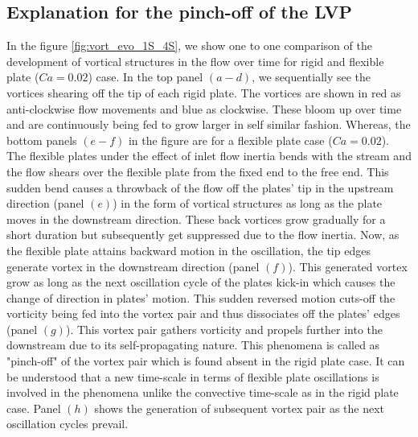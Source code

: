 \documentclass[final,3p,10pt,times,review,authoryear]{elsarticle}
\begin{document}
	\subsection{Explanation for the pinch-off of the LVP}
	 
	In the figure \ref{fig:vort_evo_1S_4S}, we show one to one comparison of the development of vortical structures in the flow over time for rigid and flexible plate ($Ca=0.02$) case. In the top panel $(a-d)$, we sequentially see the vortices shearing off the tip of each rigid plate. The vortices are shown in red as anti-clockwise flow movements and blue as clockwise. These bloom up over time and are continuously being fed to grow larger in self similar fashion. Whereas, the bottom panels $(e-f)$ in the figure are for a flexible plate case ($Ca=0.02$). The flexible plates under the effect of inlet flow inertia bends with the stream and the flow shears over the flexible plate from the fixed end to the free end. This sudden bend causes a throwback of the flow off the plates' tip in the upstream direction (panel $(e)$) in the form of vortical structures as long as the plate moves in the downstream direction. These back vortices grow gradually for a short duration but subsequently get suppressed due to the flow inertia. Now, as the flexible plate attains backward motion in the oscillation, the tip edges generate vortex in the downstream direction (panel $(f)$). This generated vortex grow as long as the next oscillation cycle of the plates kick-in which causes the change of direction in plates' motion. This sudden reversed motion cuts-off the vorticity being fed into the vortex pair and thus dissociates off the plates' edges (panel $(g)$). This vortex pair gathers vorticity and propels further into the downstream due to its self-propagating nature. This phenomena is called as "pinch-off" of the vortex pair which is found absent in the rigid plate case. It can be understood that a new time-scale in terms of flexible plate oscillations is involved in the phenomena unlike the convective time-scale as in the rigid plate case. Panel $(h)$ shows the generation of subsequent vortex pair as the next oscillation cycles prevail.
	
\end{document}
